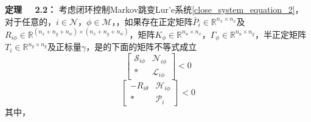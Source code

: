 	{\bf 定理 \ \ 2.2：}
	考虑闭环控制Markov跳变Lur'e系统\eqref{close_system_equation_2}，对于任意的，$i\in\mathcal{N}$，$\phi\in\mathcal{M}$，，如果存在正定矩阵$\bar{P}_{i}\in\mathbb{R}^{n_x\times n_x}$及$R_{i\phi}\in \mathbb{R}^{(n_x+n_y+n_w)\times(n_x+n_y+n_w)}$，矩阵$K_{\phi}\in\mathbb{R}^{n_u\times n_x}$，$\varGamma_{\phi}\in \mathbb{R}^{n_u\times n_y}$，半正定矩阵$T_{i}\in\mathbb{R}^{n_y\times n_y}$及正标量$\gamma$，是的下面的矩阵不等式成立
	\begin{equation} \label{condition_2_2}
	\begin{bmatrix}
	\mathscr{S}_{i\phi}&\mathscr{N}_{i\phi}\\
	*&\mathscr{L}_{i\phi}
	\end{bmatrix}<0
	\end{equation}
	\begin{equation} \label{condition_2_1}
	\begin{bmatrix}
	-R_{i\theta}&\mathscr{H}_{i\phi}\\
	*&\mathscr{P}_{i}
	\end{bmatrix}<0
	\end{equation}
	其中，
